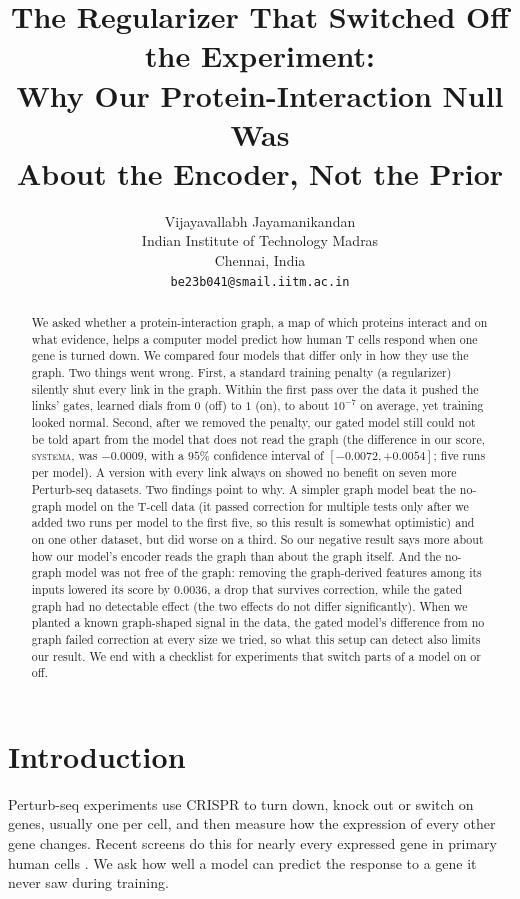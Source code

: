 \documentclass{article}
\title{The Regularizer That Switched Off the Experiment:\\ Why Our Protein-Interaction Null Was\\ About the Encoder, Not the Prior}
\author{Vijayavallabh Jayamanikandan \\ Indian Institute of Technology Madras \\ Chennai, India \\ \texttt{be23b041@smail.iitm.ac.in}}
\begin{document}
\maketitle

\begin{abstract}
We asked whether a protein-interaction graph, a map of which proteins interact and on what evidence,
helps a computer model predict how human T cells respond when one gene is turned down. We compared four
models that differ only in how they use the graph. Two things went wrong. First, a standard training
penalty (a regularizer) silently shut every link in the graph. Within the first pass over the data it
pushed the links' gates, learned dials from $0$ (off) to $1$ (on), to about $10^{-7}$ on average, yet
training looked normal. Second, after we removed the penalty, our gated model still
could not be told apart from the model that does not read the graph (the difference in our score,
\textsc{systema}, was $-0.0009$, with a $95\%$ confidence interval of $[-0.0072,+0.0054]$; five runs per
model). A version with every link always on showed no benefit on seven more Perturb-seq datasets. Two
findings point to why. A simpler graph model beat the no-graph model on the T-cell data (it passed
correction for multiple tests only after we added two runs per model to the first five, so this result is
somewhat optimistic) and on one other dataset, but did worse on a third. So our negative result says more about how our model's encoder reads the graph than
about the graph itself. And the no-graph model was not free of the graph: removing the graph-derived
features among its inputs lowered its score by $0.0036$, a drop that survives correction, while the
gated graph had no detectable effect (the two effects do not differ significantly). When we planted a
known graph-shaped signal in the data, the gated model's difference from no graph failed correction at
every size we tried, so what this setup can detect also limits our result. We end with a checklist for
experiments that switch parts of a model on or off.
\end{abstract}

\section{Introduction}

Perturb-seq experiments use CRISPR to turn down, knock out or switch on genes, usually one per cell, and
then measure how the expression of every other gene changes. Recent screens do this for nearly every
expressed gene in primary human cells \citep{dixit2016perturbseq,replogle2022genomescale,zhu2025gwperturbseq}.
We ask how well a model can predict the response to a gene it never saw during training.
\end{document}
